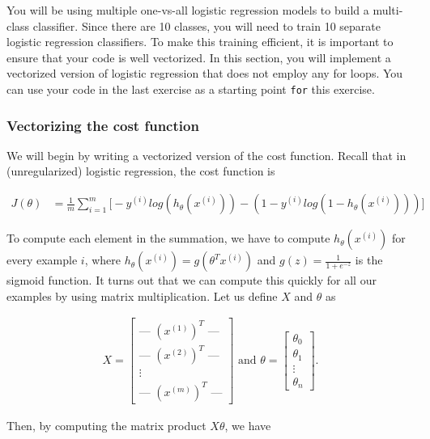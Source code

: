 \documentclass[12pt]{article}
\begin{document}
You will be using multiple one-vs-all logistic regression models to build a multi-class classifier. Since there are 10 classes, you will need to train 10 separate logistic regression classifiers. To make this training efficient, it is important to ensure that your code is well vectorized. In this section, you will implement a vectorized version of logistic regression that does not employ any for loops. You can use your code in the last exercise as a starting point \texttt{for} this exercise.

\subsubsection{Vectorizing the cost function}

We will begin by writing a vectorized version of the cost function. Recall that in (unregularized) logistic regression, the cost function is

\begin{align}
  J(\theta) & = \frac{1}{m}\sum_{i=1}^m{\big[-y^{(i)}log(h_\theta(x^{(i)}))-(1-y^{(i)}log(1-h_\theta(x^{(i)})))\big]}
\end{align}

To compute each element in the summation, we have to compute $h_\theta(x^{(i)})$ for every example $i$, where $h_\theta(x^{(i)}) = g(\theta^Tx^{(i)})$ and $g(z) = \frac{1}{1+e^{-z}}$ is the sigmoid function. It turns out that we can compute this quickly for all our examples by using matrix multiplication. Let us define $X$ and $\theta$ as


\begin{align}
  \mathbf {}X = \begin{bmatrix} \text{--- }(x^{(1)})^T \text{ ---} \\ \text{--- }(x^{(2)})^T \text{ ---} \\ \vdots \\ \text{--- }(x^{(m)})^T \text{ ---} \end{bmatrix} \text{ and } \theta = \begin{bmatrix} \theta_0 \\ \theta_1 \\ \vdots \\ \theta_n \end{bmatrix} .
\end{align}

Then, by computing the matrix product $X\theta$, we have
\end{document}
